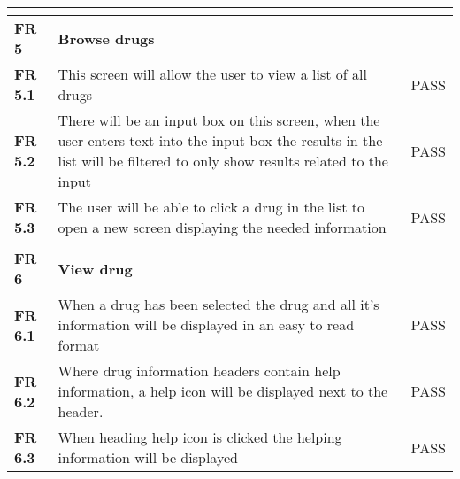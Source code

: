 \begin{center}
\begin{longtable}{| l | p{11cm} | c |}
\textbf{}                       &                                                                                                                                                                            &           \\ \hline
\textbf{FR 5}                   & \textbf{Browse drugs}                                                                                                                                                      &           \\ \hline
\textbf{FR 5.1}                 & This screen will allow the user to view a list of all drugs                                                                                                                & PASS      \\ \hline
\textbf{FR 5.2}                 & There will be an input box on this screen, when the user enters text into the input box the results in the list will be filtered to only show results related to the input & PASS      \\ \hline
\textbf{FR 5.3}                 & The user will be able to click a drug in the list to open a new screen displaying the needed information                                                                   & PASS      \\ \hline
\textbf{}                       &                                                                                                                                                                            &           \\ \hline
\textbf{FR 6}                   & \textbf{View drug}                                                                                                                                                         &           \\ \hline
\textbf{FR 6.1}                 & When a drug has been selected the drug and all it’s information will be displayed in an easy to read format                                                                & PASS      \\ \hline
\textbf{FR 6.2}                 & Where drug information headers contain help information, a help icon will be displayed next to the header.                                                                 & PASS      \\ \hline
\textbf{FR 6.3}                 & When heading help icon is clicked the helping information will be displayed                                                                                                & PASS      \\ \hline

\end{longtable}
\end{center}
